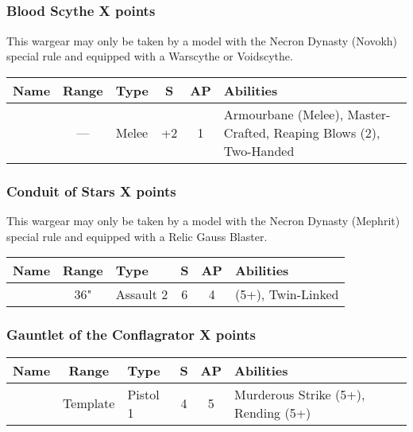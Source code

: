 \newpage
\subsection[Artefacts of the Aeons]{} \label{Artefacts of the Aeons}

\subsubsection[Blood Scythe]{Blood Scythe \dotfill X points}

This wargear may only be taken by a model with the Necron Dynasty (Novokh) special rule and equipped with a Warscythe or Voidscythe.

\label{Blood Scythe}
\noindent
\begin{NiceTabular}{L{115 pt} c C{40pt} *{2}{c} >{\raggedright\arraybackslash}p{240pt}}
	Name & Range & Type & S & AP & Abilities \\
	\hline
	 & — & Melee & +2 & 1 & Armourbane (Melee), Master-Crafted, Reaping Blows (2), Two-Handed \\
\end{NiceTabular}

\subsubsection[Conduit of Stars]{Conduit of Stars \dotfill X points}
This wargear may only be taken by a model with the Necron Dynasty (Mephrit) special rule and equipped with a Relic Gauss Blaster.

\label{Conduit of Stars}
\noindent
\begin{NiceTabular}{L{115 pt} c C{40pt} *{2}{c} >{\raggedright\arraybackslash}p{240pt}}
	Name & Range & Type & S & AP & Abilities \\
	\hline
	 & 36" & Assault 2 & 6 & 4 &  (5+), Twin-Linked \\	
\end{NiceTabular}


\subsubsection[Gauntlet of the Conflagrator]{Gauntlet of the Conflagrator \dotfill X points}

\label{Gauntlet of the Conflagrator}
\noindent
\begin{NiceTabular}{L{115 pt} c C{40pt} *{2}{c} >{\raggedright\arraybackslash}p{240pt}}
	Name & Range & Type & S & AP & Abilities \\
	\hline
	 & Template & Pistol 1 & 4 & 5 & Murderous Strike (5+), Rending (5+) \\	
\end{NiceTabular}

